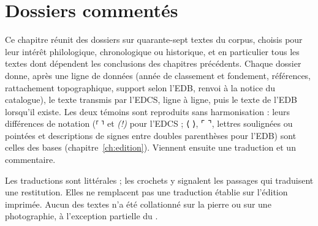 \chapter{Dossiers commentés}\label{ch:dossiers}

Ce chapitre réunit des dossiers sur quarante-sept textes du corpus, choisis pour leur intérêt philologique, chronologique ou historique, et en particulier tous les textes dont dépendent les conclusions des chapitres précédents. Chaque dossier donne, après une ligne de données (année de classement et fondement, références, rattachement topographique, support selon l’EDB, renvoi à la notice du catalogue), le texte transmis par l’EDCS, ligne à ligne, puis le texte de l’EDB lorsqu’il existe. Les deux témoins sont reproduits sans harmonisation : leurs différences de notation (⸢ ⸣ et \emph{(!)} pour l’EDCS ; ⟨ ⟩, ⌜ ⌝, lettres soulignées ou pointées et descriptions de signes entre doubles parenthèses pour l’EDB) sont celles des bases (chapitre~\ref{ch:edition}). Viennent ensuite une traduction et un commentaire.

Les traductions sont littérales ; les crochets y signalent les passages qui traduisent une restitution. Elles ne remplacent pas une traduction établie sur l’édition imprimée. Aucun des textes n’a été collationné sur la pierre ou sur une photographie, à l’exception partielle du .




